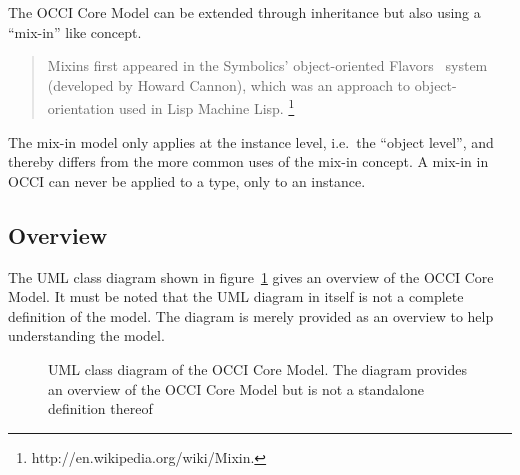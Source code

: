 \documentclass[10pt,a4paper]{article}
\begin{document}
The OCCI Core Model can be extended through inheritance but also
using a ``mix-in'' like concept.

\begin{quote}
  Mixins first appeared in the Symbolics' object-oriented
  Flavors~\cite{Moon:1986:flavors} system (developed by Howard
  Cannon), which was an approach to object-orientation used in Lisp
  Machine Lisp. \footnote{http://en.wikipedia.org/wiki/Mixin.}
\end{quote}

The mix-in model only applies at the instance level, i.e.~the ``object
level'', and thereby differs from the more common uses of the mix-in
concept. A mix-in in OCCI can never be applied to a type, only to an
instance.

\subsection{Overview}

The UML class diagram shown in figure~\ref{fig:occi_model} gives an
overview of the OCCI Core Model. It must be noted that the UML diagram
in itself is not a complete definition of the model. The diagram is
merely provided as an overview to help understanding the model.

\begin{figure}[!h]
  {\centering {} \par}
  \caption{UML class diagram of the OCCI Core Model. The diagram
    provides an overview of the OCCI Core Model but is not a
    standalone definition thereof}
  \label{fig:occi_model}
\end{figure}
\end{document}
